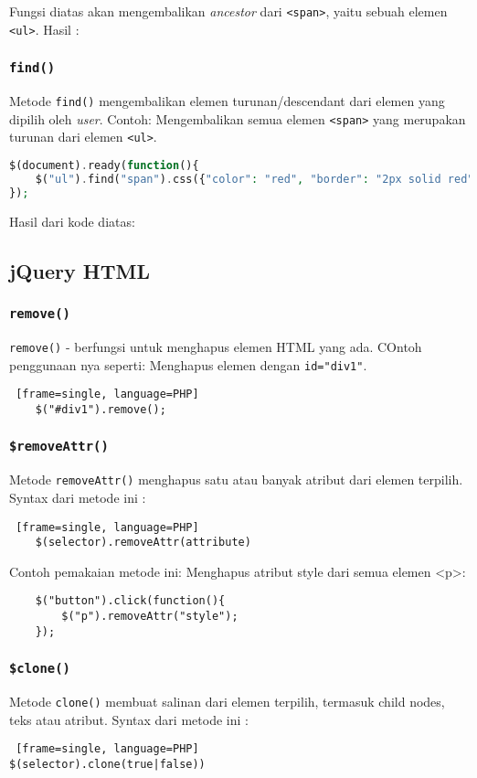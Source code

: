 \begin{itemize}
Fungsi diatas akan mengembalikan \textit{ancestor} dari \texttt{<span>}, yaitu sebuah elemen \texttt{<ul>}.
Hasil :

\subsubsection{\texttt{find()}}
Metode \texttt{find()} mengembalikan elemen turunan/descendant dari elemen yang dipilih oleh \textit{user}.
Contoh: Mengembalikan semua elemen \texttt{<span>} yang merupakan turunan dari elemen \texttt{<ul>}.
\begin{lstlisting}[language=PHP]
$(document).ready(function(){
	$("ul").find("span").css({"color": "red", "border": "2px solid red"});
});
\end{lstlisting}

Hasil dari kode diatas: 


\subsection{jQuery HTML}
\subsubsection{\texttt{remove()}}
\texttt{remove()} - berfungsi untuk menghapus elemen HTML yang ada. COntoh penggunaan nya seperti:
Menghapus elemen dengan \texttt{id="div1"}.
\begin{lstlisting} [frame=single, language=PHP]
	$("#div1").remove();
\end{lstlisting}

\subsubsection{\texttt{\$removeAttr()}}
Metode \texttt{removeAttr()} menghapus satu atau banyak atribut dari elemen terpilih.
Syntax dari metode ini :
\begin{lstlisting} [frame=single, language=PHP]
	$(selector).removeAttr(attribute)
\end{lstlisting}

Contoh pemakaian metode ini: Menghapus atribut style dari semua elemen <p>:
\begin{lstlisting}
	$("button").click(function(){
		$("p").removeAttr("style");
	});
\end{lstlisting}

\subsubsection{\texttt{\$clone()}}
Metode \texttt{clone()} membuat salinan dari elemen terpilih, termasuk child nodes, teks atau atribut.
Syntax dari metode ini :
\begin{lstlisting} [frame=single, language=PHP]
$(selector).clone(true|false))
\end{lstlisting}


\end{itemize}
